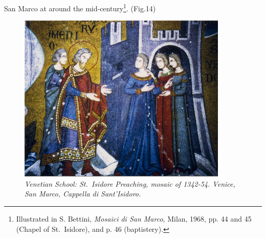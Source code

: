 \documentclass[a4paper,12pt]{article}
\begin{document}
San Marco at around the mid-century\footnote{Illustrated in
S. Bettini, \textit{Mosaici di San Marco}, Milan, 1968, pp. 44 and 45
(Chapel of St.~Isidore), and p. 46 (baptistery).}. (Fig.14)
\begin{figure}[htbp]
\centering
\includegraphics[width=10cm]{pics/fig14.png}
\caption[Venetian School: St.~Isidore Preaching, mosaic of 1342-54]
{\it Venetian School: St.~Isidore Preaching, mosaic of 1342-54.
Venice, San Marco, Cappella di Sant'Isidoro.} 
\end{figure}
\end{document}
